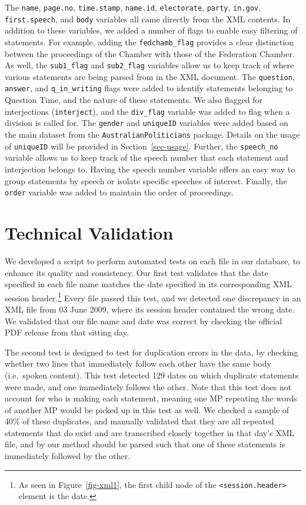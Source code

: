 \documentclass[
  letterpaper,
  DIV=11,
  numbers=noendperiod]{scrartcl}
\begin{document}
The \texttt{name}, \texttt{page.no}, \texttt{time.stamp},
\texttt{name.id}, \texttt{electorate}, \texttt{party}, \texttt{in.gov},
\texttt{first.speech}, and \texttt{body} variables all came directly
from the XML contents. In addition to these variables, we added a number
of flags to enable easy filtering of statements. For example, adding the
\texttt{fedchamb\_flag} provides a clear distinction between the
proceedings of the Chamber with those of the Federation Chamber. As
well, the \texttt{sub1\_flag} and \texttt{sub2\_flag} variables allow us
to keep track of where various statements are being parsed from in the
XML document. The \texttt{question}, \texttt{answer}, and
\texttt{q\_in\_writing} flags were added to identify statements
belonging to Question Time, and the nature of these statements. We also
flagged for interjections (\texttt{interject}), and the
\texttt{div\_flag} variable was added to flag when a division is called
for. The \texttt{gender} and \texttt{uniqueID} variables were added
based on the main dataset from the \texttt{AustralianPoliticians}
package. Details on the usage of \texttt{uniqueID} will be provided in
Section~\ref{sec-usage}. Further, the \texttt{speech\_no} variable
allows us to keep track of the speech number that each statement and
interjection belongs to. Having the speech number variable offers an
easy way to group statements by speech or isolate specific speeches of
interest. Finally, the \texttt{order} variable was added to maintain the
order of proceedings.

\hypertarget{technical-validation}{%
\section{Technical Validation}\label{technical-validation}}

We developed a script to perform automated tests on each file in our
database, to enhance its quality and consistency. Our first test
validates that the date specified in each file name matches the date
specified in its corresponding XML session header.\footnote{As seen in
  Figure~\ref{fig-xml1}, the first child node of the
  \texttt{\textless{}session.header\textgreater{}} element is the date.}
Every file passed this test, and we detected one discrepancy in an XML
file from 03 June 2009, where its session header contained the wrong
date. We validated that our file name and date was correct by checking
the official PDF release from that sitting day.

The second test is designed to test for duplication errors in the data,
by checking whether two lines that immediately follow each other have
the same body (i.e.~spoken content). This test detected 129 dates on
which duplicate statements were made, and one immediately follows the
other. Note that this test does not account for who is making each
statement, meaning one MP repeating the words of another MP would be
picked up in this test as well. We checked a sample of 40\% of these
duplicates, and manually validated that they are all repeated statements
that do exist and are transcribed closely together in that day's XML
file, and by our method should be parsed such that one of these
statements is immediately followed by the other.
\end{document}
